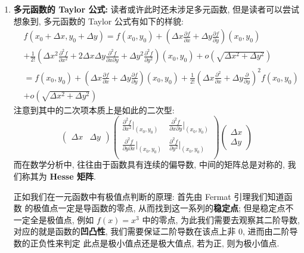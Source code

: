 \documentclass[UTF8]{book}
\begin{document}
\begin{enumerate}
    \item \textbf{多元函数的 Taylor 公式:} 读者或许此时还未涉足多元函数, 
    但是读者可以尝试想象到, 多元函数的 Taylor 公式有如下的样貌: 
\begin{equation*}
    \begin{aligned}
        &f(x_0 + \Delta x,y_0+\Delta y)
        =f(x_0,y_0)+\left(\Delta x
        \frac{\partial f}{\partial x}+\Delta y
        \frac{\partial f}{\partial y}\right)(x_0,y_0)\\
        &+\frac{1}{2!}\left(\Delta x^2\frac{\partial^{2}f}{\partial x^{2}}
        +2\Delta x\Delta y\frac{\partial^{2}f}{\partial x\partial y}
        +\Delta y^2\frac{\partial^{2}f}{\partial y^{2}}\right)(x_0,y_0)
        + o(\sqrt{\Delta x^2+\Delta y^2})\\
        &=f(x_0,y_0)+\left(\Delta x
        \frac{\partial f}{\partial x}+\Delta y
        \frac{\partial f}{\partial y}\right)(x_0,y_0)
        +\frac{1}{2!}\left(\Delta x\frac{\partial^{2}}{\partial x}
        +\Delta y \frac{\partial}{\partial y}\right)^2f(x_0,y_0)\\
        &+o(\sqrt{\Delta x^2+\Delta y^2})
        \end{aligned}
\end{equation*}
    注意到其中的二次项本质上是如此的二次型:
    \begin{equation*}
        \begin{pmatrix}
            \Delta x &
            \Delta y 
        \end{pmatrix}
        \begin{pmatrix}
            \frac{\partial^2 f}{\partial x^2}|_{(x_0,y_0)} & 
            \frac{\partial^2 f}{\partial x\partial y}|_{(x_0,y_0)} \\
            \frac{\partial^2 f}{\partial y\partial x}|_{(x_0,y_0)} & 
            \frac{\partial^2 f}{\partial y^2}|_{(x_0,y_0)} \\
        \end{pmatrix}
        \begin{pmatrix}
            \Delta x \\
            \Delta y 
        \end{pmatrix}
    \end{equation*}
    而在数学分析中, 往往由于函数具有连续的偏导数, 中间的矩阵总是对称的, 
    我们称其为 \textbf{Hesse 矩阵}. 
    
    正如我们在一元函数中有极值点判断的原理: 首先由 Fermat 引理我们知道函数
    的极值点一定是导函数的零点, 从而找到这一系列的\textbf{稳定点}; 
    但是稳定点不一定全是极值点, 例如 $f(x) = x^3$ 中的零点, 
    为此我们需要去观察其二阶导数, 对应的就是函数的\textbf{凹凸性}, 
    我们需要保证二阶导数在该点上非 0, 进而由二阶导数的正负性来判定
    此点是极小值点还是极大值点, 若为正, 则为极小值点. 


\end{enumerate}
\end{document}
